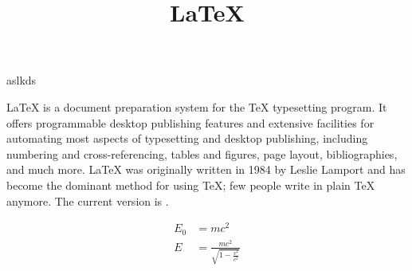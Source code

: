 \documentclass{article} %
\title{\LaTeX} %
\begin{document}
  \maketitle
  aslkds
  
  \LaTeX{} is a document preparation system for
  the \TeX{} typesetting program. It offers
  programmable desktop publishing features and
  extensive facilities for automating most
  aspects of typesetting and desktop publishing,
  including numbering and cross-referencing,
  tables and figures, page layout,
  bibliographies, and much more. \LaTeX{} was
  originally written in 1984 by Leslie Lamport
  and has become the dominant method for using
  \TeX; few people write in plain \TeX{} anymore.
  The current version is \LaTeXe.

  \begin{align}
    E_0 &= mc^2 \\
    E &= \frac{mc^2}{\sqrt{1-\frac{v^2}{c^2}}}
  \end{align} 
\end{document}
